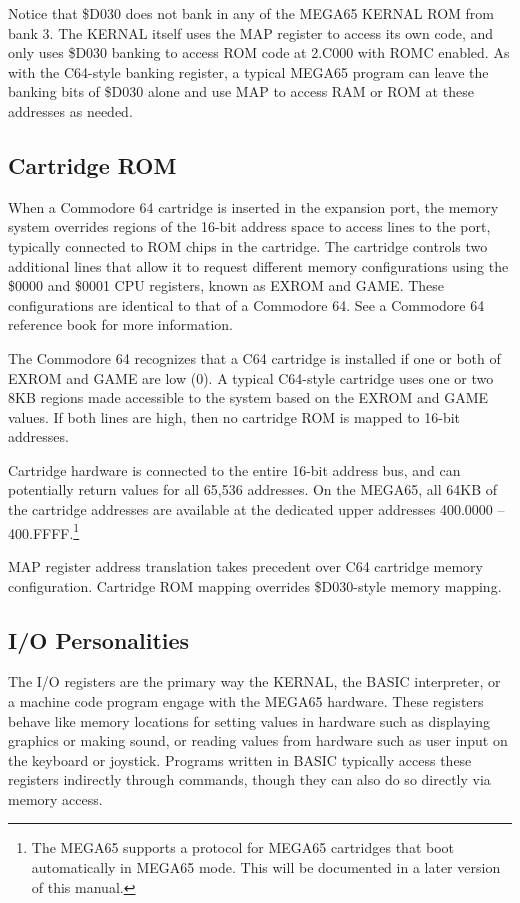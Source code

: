 Notice that \$D030 does not bank in any of the MEGA65 KERNAL ROM from bank 3.
The KERNAL itself uses the MAP register to access its own code, and only uses
\$D030 banking to access ROM code at 2.C000 with ROMC enabled. As with the
C64-style banking register, a typical MEGA65 program can leave the banking
bits of \$D030 alone and use MAP to access RAM or ROM at these addresses as
needed.

\subsection{Cartridge ROM}

When a Commodore 64 cartridge is inserted in the expansion port, the memory
system overrides regions of the 16-bit address space to access lines to the
port, typically connected to ROM chips in the cartridge. The cartridge
controls two additional lines that allow it to request different memory
configurations using the \$0000 and \$0001 CPU registers, known as EXROM
and GAME. These configurations are identical to that of a Commodore 64.
See a Commodore 64 reference book for more information.

The Commodore 64 recognizes that a C64 cartridge is installed if one or both
of EXROM and GAME are low (0). A typical C64-style cartridge uses one or two
8KB regions made accessible to the system based on the EXROM and GAME values.
If both lines are high, then no cartridge ROM is mapped to 16-bit addresses.

Cartridge hardware is connected to the entire 16-bit address bus, and can
potentially return values for all 65,536 addresses. On the MEGA65, all 64KB of
the cartridge addresses are available at the dedicated upper addresses
400.0000 -- 400.FFFF.\footnote{The MEGA65 supports a protocol for
MEGA65 cartridges that boot automatically in MEGA65 mode. This will be
documented in a later version of this manual.}

MAP register address translation takes precedent over C64 cartridge memory
configuration. Cartridge ROM mapping overrides \$D030-style memory mapping.

\subsection{I/O Personalities}

The I/O registers are the primary way the KERNAL, the BASIC interpreter, or a
machine code program engage with the MEGA65 hardware. These registers behave
like memory locations for setting values in hardware such as displaying
graphics or making sound, or reading values from hardware such as user input on
the keyboard or joystick. Programs written in BASIC typically access these
registers indirectly through commands, though they can also do so directly via
memory access.

